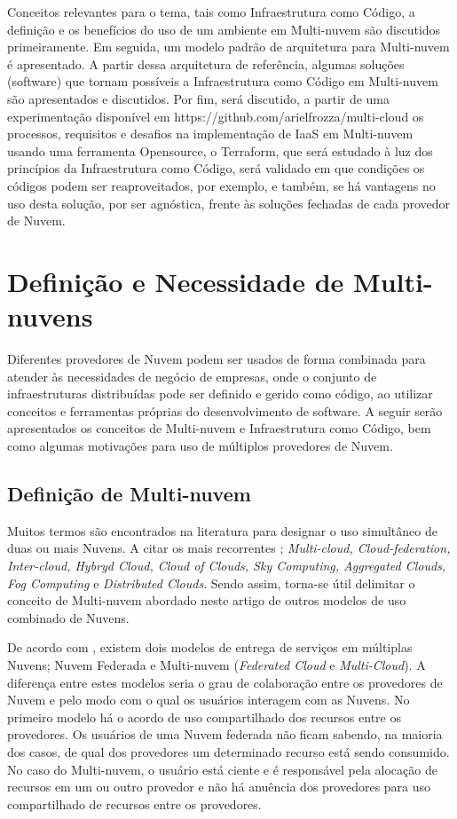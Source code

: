 \documentclass[12pt]{article}
\begin{document}
	    Conceitos relevantes para o tema, tais como Infraestrutura como Código, a definição e os benefícios do uso de um ambiente em Multi-nuvem são discutidos primeiramente. Em seguida, um modelo padrão de arquitetura para Multi-nuvem é apresentado. A partir dessa arquitetura de referência, algumas soluções (software) que tornam possíveis a Infraestrutura como Código em Multi-nuvem são apresentados e discutidos. Por fim, será discutido, a partir de uma experimentação disponível em https://github.com/arielfrozza/multi-cloud os processos, requisitos e desafios na implementação de IaaS em Multi-nuvem usando uma ferramenta Opensource, o Terraform, que será estudado à luz dos princípios da Infraestrutura como Código, será validado em que condições os códigos podem ser reaproveitados, por exemplo, e também, se há vantagens no uso desta solução, por ser agnóstica, frente às soluções fechadas de cada provedor de Nuvem.
		
	\section{Definição e Necessidade de Multi-nuvens}
	
	Diferentes provedores de Nuvem podem ser usados de forma combinada para atender às necessidades de negócio de empresas, onde o conjunto de infraestruturas distribuídas pode ser definido e gerido como código, ao utilizar conceitos e ferramentas próprias do desenvolvimento de software. A seguir serão apresentados os conceitos de Multi-nuvem e Infraestrutura como Código, bem como algumas motivações para uso de múltiplos provedores de Nuvem.
	
	\subsection{Definição de Multi-nuvem}
	
	Muitos termos são encontrados na literatura para designar o uso simultâneo de duas ou mais Nuvens. A citar os mais recorrentes \cite{Ferrer:2012}; \textit{Multi-cloud, Cloud-federation, Inter-cloud, Hybryd Cloud, Cloud of Clouds, Sky Computing, Aggregated Clouds, Fog Computing} e \textit{Distributed Clouds}. Sendo assim, torna-se útil delimitar o conceito de Multi-nuvem abordado neste artigo de outros modelos de uso combinado de Nuvens.
	
	De acordo com \cite{Ferrer:2012}, existem dois modelos de entrega de serviços em múltiplas Nuvens; Nuvem Federada e Multi-nuvem (\textit{Federated Cloud} e \textit{Multi-Cloud}). A diferença entre estes modelos seria o grau de colaboração entre os provedores de Nuvem e pelo modo com o qual os usuários interagem com as Nuvens. No primeiro modelo há o acordo de uso compartilhado dos recursos entre os provedores. Os usuários de uma Nuvem federada não ficam sabendo, na maioria dos casos, de qual dos provedores um determinado recurso está sendo consumido. No caso do Multi-nuvem, o usuário está ciente e é responsável pela alocação de recursos em um ou outro provedor e não há anuência dos provedores para uso compartilhado de recursos entre os provedores.
	
\end{document}
